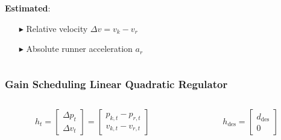 \documentclass[9pt, aspectratio=169]{beamer}
\begin{document}
\begin{frame}[t]
\begin{columns}
\begin{column}{0.4\textwidth}
\hspace{1.5cm} \textbf{Estimated}:
\begin{itemize}
	\footnotesize
	\item[$\blacktriangleright$] Relative velocity  $\Delta v = v_k - v_r$
	\item[$\blacktriangleright$] Absolute runner acceleration  $a_r$
\end{itemize}
\end{column}
\end{columns}
\end{frame}



\begin{frame}
\frametitle{Gain Scheduling Linear Quadratic Regulator}

\begin{columns}
\begin{column}{0.4\textwidth}
\centering

\begin{columns}
\begin{column}{0.6\textwidth}
\centering
\begin{block}{}
\begin{equation*}
    h_t =
    \begin{bmatrix}
        \Delta p_t  \\
        \Delta v_t
    \end{bmatrix}
	=
    \begin{bmatrix}
        p_{k,t} - p_{r,t} \\
        v_{k,t} - v_{r,t}
    \end{bmatrix}
\end{equation*}

\end{block}
\end{column}

\begin{column}{0.3\textwidth}
\centering
\begin{block}{}
\begin{equation*}
    h_{\text{des}} =
    \begin{bmatrix}
        d_{\text{des}} \\
        0
    \end{bmatrix}
\end{equation*}
\end{block}
\end{column}
\end{columns}


\end{column}
\end{columns}
\end{frame}
\end{document}
